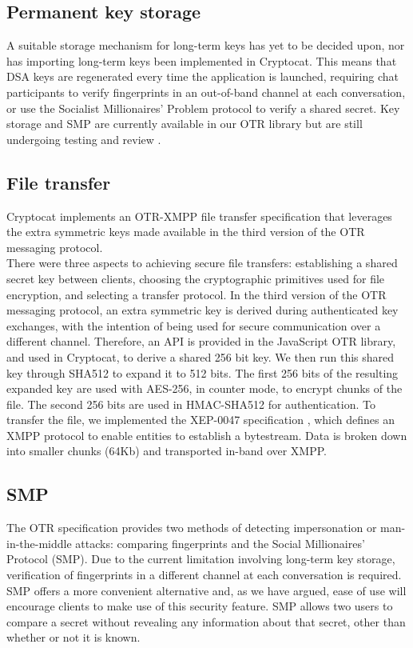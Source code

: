 \documentclass[letterpaper,twocolumn,10pt]{article}
\begin{document}
\subsection{Permanent key storage}

A suitable storage mechanism for long-term keys has yet to be decided upon, nor has importing long-term keys been implemented in Cryptocat. This means that DSA keys are regenerated every time the application is launched, requiring chat participants to verify fingerprints in an out-of-band channel at each conversation, or use the Socialist Millionaires' Problem protocol to verify a shared secret. Key storage and SMP are currently available in our OTR library but are still undergoing testing and review \cite{smp}.

\subsection{File transfer}

Cryptocat implements an OTR-XMPP file transfer specification \cite{filetransfer-spec} that leverages the extra symmetric keys made available in the third version of the OTR messaging protocol. \\
There were three aspects to achieving secure file transfers: establishing a shared secret key between clients, choosing the cryptographic primitives used for file encryption, and selecting a transfer protocol. In the third version of the OTR messaging protocol, an extra symmetric key is derived during authenticated key exchanges, with the intention of being used for secure communication over a different channel. Therefore, an API is provided in the JavaScript OTR library, and used in Cryptocat, to derive a shared 256 bit key. We then run this shared key through SHA512 to expand it to 512 bits. The first 256 bits of the resulting expanded key are used with AES-256, in counter mode, to encrypt chunks of the file. The second 256 bits are used in HMAC-SHA512 for authentication. To transfer the file, we implemented the XEP-0047 specification \cite{ibb}, which defines an XMPP protocol to enable entities to establish a bytestream. Data is broken down into smaller chunks (64Kb) and transported in-band over XMPP.

\subsection{SMP}

The OTR specification provides two methods of detecting impersonation or man-in-the-middle attacks: comparing fingerprints and the Social Millionaires' Protocol (SMP). Due to the current limitation involving long-term key storage, verification of fingerprints in a different channel at each conversation is required. SMP offers a more convenient alternative and, as we have argued, ease of use will encourage clients to make use of this security feature. SMP allows two users to compare a secret without revealing any information about that secret, other than whether or not it is known.
\end{document}
